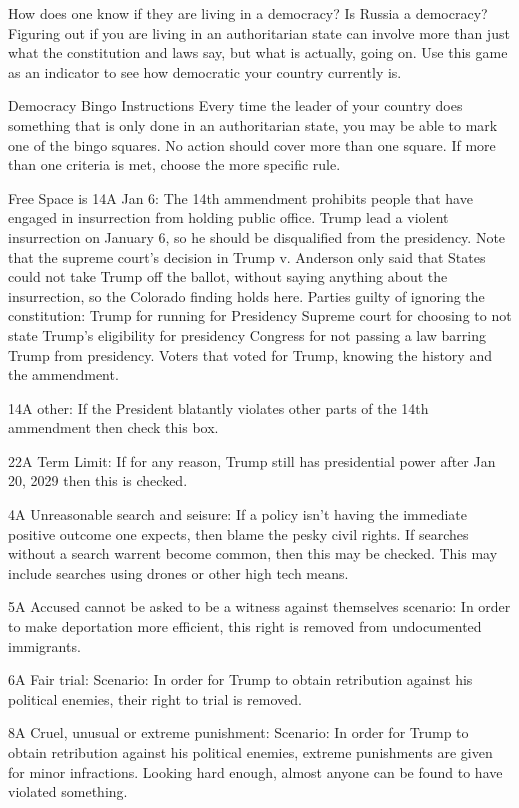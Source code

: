 \documentclass{article}
\begin{document}
How does one know if they are living in a democracy?  Is Russia a democracy?
Figuring out if you are living in an authoritarian state can involve more than just
what the constitution and laws say, but what is actually, going on.
Use this game as an indicator to see how democratic your country currently is.

Democracy Bingo Instructions
Every time the leader of your country does something that is only done in an authoritarian state,
you may be able to mark one of the bingo squares.  No action should cover more than one square.
If more than one criteria is met, choose the more specific rule.

Free Space is 14A Jan 6:
The 14th ammendment prohibits people that have engaged in insurrection from
holding public office.  Trump lead a violent insurrection on January 6, so he should be disqualified
from the presidency.  Note that the supreme court's decision in Trump v. Anderson only said that
States could not take Trump off the ballot, without saying anything about the insurrection,
so the Colorado finding holds here.
Parties guilty of ignoring the constitution:
Trump for running for Presidency
Supreme court for choosing to not state Trump's eligibility for presidency
Congress for not passing a law barring Trump from presidency.
Voters that voted for Trump, knowing the history and the ammendment.

14A other: If the President blatantly violates other parts of the 14th ammendment
then check this box.

22A Term Limit: If for any reason, Trump still has presidential power after Jan 20, 2029
then this is checked.

4A Unreasonable search and seisure:  If a policy isn't having the immediate positive outcome one
expects, then blame the pesky civil rights.  If searches without a search warrent become common, then
this may be checked.  This may include searches using drones or other high tech means.

5A Accused cannot be asked to be a witness against themselves
scenario: In order to make deportation more efficient, this right is removed from undocumented immigrants.

6A Fair trial:  Scenario: In order for Trump to obtain retribution against his political enemies, their right to trial
is removed.

8A Cruel, unusual or extreme punishment:
Scenario: In order for Trump to obtain retribution against his political enemies, extreme punishments are given
for minor infractions.  Looking hard enough, almost anyone can be found to have violated something.
\end{document}
